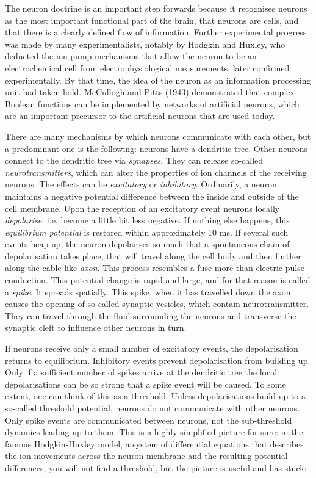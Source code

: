 The neuron doctrine is an important step forwards because it recognises neurons as the most important functional part of the brain, that neurons are
cells, and that there is a clearly defined flow of information. Further experimental progress was made by many experimentalists, notably by
Hodgkin and Huxley, who deducted the  ion pump mechanisms that allow the neuron to be an electrochemical cell from electrophysiological
measurements, later confirmed experimentally. By that time, the idea
of the neuron as an information processing unit had taken hold. McCullogh and Pitts (1943) demonstrated that complex Boolean functions
can be implemented by networks of artificial neurons, which are an important precursor to the artificial neurons that are used today.

There are many mechanisms by which neurons communicate with each other, but a predominant one is the following:
neurons have a dendritic tree. Other neurons connect to the dendritic tree via \emph{synapses}. They can release so-called
\emph{neurotransmitters}, which can alter the properties of ion channels of the receiving neurons. The effects can be \emph{excitatory}
or \emph{inhibitory}. Ordinarily, a neuron maintains a negative potential difference between the inside and outside of the cell membrane.
Upon the reception of an excitatory event neurons locally \emph{depolarise}, i.e. become a little bit less negative. If nothing else
happens, this \emph{equilibrium potential} is restored within approximately 10 ms. If several such events heap up, the neuron depolarises so much that
a spontaneous chain of depolarisation takes place, that will travel along the cell body and then further along the cable-like \emph{axon}. This process
resembles a fuse more than electric pulse conduction.
This potential change is rapid and large, and for that reason is called a \emph{spike}. It spreads spatially.  This spike, when it has travelled down the axon causes the
opening of so-called synaptic vesicles, which contain neurotransmitter. They can travel through the fluid surrounding the neurons and transverse
the synaptic cleft to influence other neurons in turn.

If neurons receive only a small number of excitatory events, the depolarisation returns to equilibrium. Inhibitory events prevent depolarisation
from building up. Only if a sufficient number of spikes arrive at the dendritic tree the local depolarisations can be so strong that a spike event will
be caused. To some extent, one can think of this as a threshold. Unless depolarisations build up to a so-called threshold potential, neurons do not
communicate with other neurons. Only spike events are communicated between neurons, not the sub-threshold dynamics leading up to them.
This is a highly simplified picture for sure: in the famous Hodgkin-Huxley \cite{hodgkin1952} model, a system of differential equations that describes the
ion movements across the neuron membrane and the resulting potential differences, you will not find a threshold, but the picture is
useful and has stuck:

